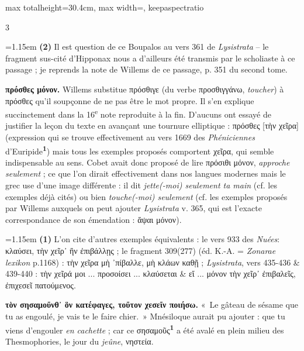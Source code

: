 \documentclass[11pt,twoside]{book}
\newcommand{\italique}[1]{\textit{#1}}
\newcommand{\nieme}[1]{#1\textsuperscript{e}}
\newcommand{\grec}[1]{{\policeGr #1}}
\newcommand{\marqueur}[1]{\textsuperscript{\color{rubricRed}\textbf{#1}}}
\begin{document}
\begin{adjustbox}{max totalheight=30.4cm, max width=\textwidth, keepaspectratio}
\begin{minipage}{\textwidth}
{\begin{multicols}{3}
\par\vspace{1.5pt}
\noindent\hangindent=1.15em {\color{sepiaNote}\textbf{(2)}} Il est question de ce Boupalos au vers 361 de \italique{Lysistrata} -- le fragment sus-cité d'Hipponax nous a d'ailleurs été transmis par le scholiaste à ce passage ; je reprends la note de Willems de ce passage, p. 351 du second tome.
\par\vspace{1.5pt}
 \textbf{πρόσθες μόνον.} Willems substitue πρόσθιγε (du verbe προσθιγγάνω, \italique{toucher}) à πρόσθες qu'il soupçonne de ne pas être le mot propre. Il s'en explique succinctement dans la \nieme{16} note reproduite à la fin. D'aucuns ont essayé de justifier la leçon du texte en avançant une tournure elliptique : πρόσθες [τὴν χεῖρα] (expression qui se trouve effectivement au vers 1669 des \italique{Phéniciennes} d'Euripide\marqueur{1}) mais tous les exemples proposés comportent χεῖρα, qui semble indispensable au sens. Cobet avait donc proposé de lire πρόσιθι μόνον, \italique{approche seulement} ; ce que l'on dirait effectivement dans nos langues modernes mais le grec use d'une image différente : il dit \italique{jette(-moi) seulement ta main} (cf. les exemples déjà cités) ou bien \italique{touche(-moi) seulement} (cf. les exemples proposés par Willems auxquels on peut ajouter \italique{Lysistrata} v. 365, qui est l'exacte correspondance de son émendation : ἅψαι μόνον).
\par\vspace{1.5pt}
\par\vspace{1.2pt}\par\nopagebreak\vspace{1pt}\noindent\hangindent=1.15em {\color{sepiaNote}\textbf{(1)}} L'on cite d'autres exemples équivalents : le vers 933 des \italique{Nuées}: κλαύσει, τὴν χεῖρ᾽ ἢν ἐπιβάλλῃς ; le fragment 309(277) (éd. K.-A. = \italique{Zonarae lexikon} p.1168) : τὴν χεῖρα μὴ ᾿πίβαλλε, μὴ κλάων καθῇ ; \italique{Lysistrata}, vers 435-436 \& 439-440 : τὴν χεῖρά μοι ... προσοίσει ... κλαύσεται \& εἴ ... μόνον τὴν χεῖρ᾽ ἐπιβαλεῖς, ἐπιχεσεῖ πατούμενος.
\par\vspace{1.5pt}
 \textbf{τὸν σησαμοῦνθ᾽ ὃν κατέφαγες, τοῦτον χεσεῖν ποιήσω.} «~Le gâteau de sésame que tu as engoulé, je vais te le faire chier.~» Mnésiloque aurait pu ajouter : que tu viens d'engouler \italique{en cachette} ; car ce \grec{σησαμοῦς}\marqueur{1} a été avalé en plein milieu des Thesmophories, le jour du \italique{jeûne}, \grec{νηστεία}.

\end{multicols}}
\end{minipage}
\end{adjustbox}
\end{document}
